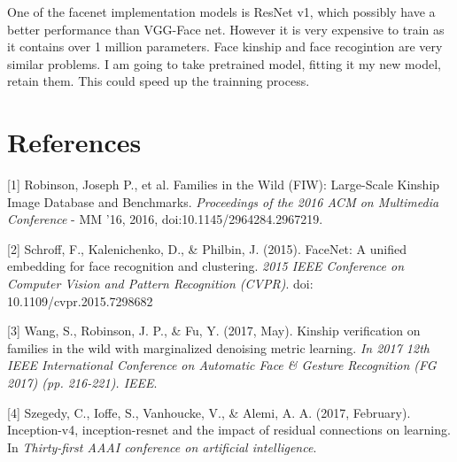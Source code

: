 \documentclass{article}
\begin{document}
One of the facenet implementation models is ResNet v1, which possibly have a
better performance than VGG-Face net. However it is very expensive to train as
it contains over 1 million parameters. Face kinship and face recogintion are
very similar problems. I am going to take pretrained model, fitting it my new
model, retain them. This could speed up the trainning process.

\newpage
\section*{References}
\medskip
\small
[1] Robinson, Joseph P., et al. Families in the Wild (FIW): Large-Scale Kinship
Image Database and Benchmarks. {\it Proceedings of the 2016 ACM on Multimedia
Conference} - MM '16, 2016, doi:10.1145/2964284.2967219.

[2] Schroff, F., Kalenichenko, D., \& Philbin, J. (2015). FaceNet: A unified
embedding for face recognition and clustering. {\it 2015 IEEE Conference on
Computer Vision and Pattern Recognition (CVPR)}. doi: 10.1109/cvpr.2015.7298682

[3] Wang, S., Robinson, J. P., \& Fu, Y. (2017, May). Kinship verification on
families in the wild with marginalized denoising metric learning. {\it In 2017 12th
IEEE International Conference on Automatic Face \& Gesture Recognition (FG 2017)
(pp. 216-221). IEEE}.

[4] Szegedy, C., Ioffe, S., Vanhoucke, V., \& Alemi, A. A. (2017, February).
Inception-v4, inception-resnet and the impact of residual connections on
learning. In {\it Thirty-first AAAI conference on artificial intelligence}.
\end{document}
